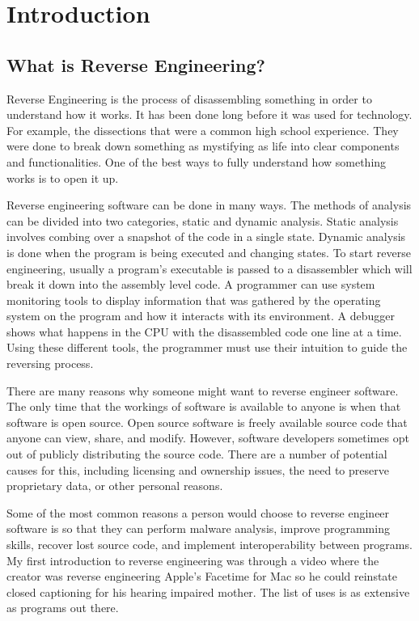 \chapter{Introduction}\label{intro}

\section{What is Reverse Engineering?}
Reverse Engineering is the process of disassembling something in order to understand how it works. 
It has been done long before it was used for technology. For example, the dissections that were a common high school experience.
They were done to break down something as mystifying as life into clear components and functionalities. 
One of the best ways to fully understand how something works is to open it up.

Reverse engineering software can be done in many ways. 
The methods of analysis can be divided into two categories, static and dynamic analysis. 
Static analysis involves combing over a snapshot of the code in a single state.
 Dynamic analysis is done when the program is being executed and changing states. To start reverse engineering, usually a program’s executable is passed to a disassembler which will break it down into the assembly level code. 
A programmer can use system monitoring tools to display information that was gathered by the operating system on the program and how it interacts with its environment. 
A debugger shows what happens in the CPU with the disassembled code one line at a time.
Using these different tools, the programmer must use their intuition to guide the reversing process. 

There are many reasons why someone might want to reverse engineer software. 
The only time that the workings of software is available to anyone is when that software is open source.
Open source software is freely available source code that anyone can view, share, and modify. 
However, software developers sometimes opt out of publicly distributing the source code. 
There are a number of potential causes for this, including licensing and ownership issues, the need to preserve proprietary data, or other personal reasons.

Some of the most common reasons a person would choose to reverse engineer software is so that they can perform malware analysis, improve programming skills, recover lost source code, and implement interoperability between programs. 
My first introduction to reverse engineering was through a video where the creator was reverse engineering Apple’s Facetime for Mac so he could reinstate closed captioning for his hearing impaired mother. 
The list of uses is as extensive as programs out there.


